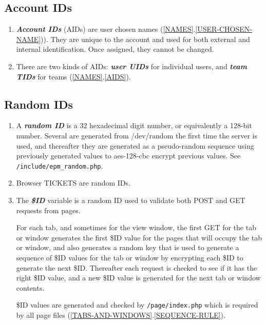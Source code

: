 \documentclass[12pt]{article}
\newcommand{\key}[1]{{\bf \em #1}}
\newcommand{\sref}[2]{(\ref{#1}.\ref{#2})}
\begin{document}
\subsection{Account IDs}

\begin{enumerate}
\item \key{Account IDs}
      (AIDs) are user chosen names \sref{NAMES}{USER-CHOSEN-NAME}).
      They are unique to the
      account and used for both external and internal identification.
      Once assigned, they cannot be changed.
\item There are two kinds of AIDs: \key{user UIDs} for individual users,
      and \key{team TIDs} for teams \sref{NAMES}{AIDS}.
\end{enumerate}

\subsection{Random IDs}

\begin{enumerate}
\item A \key{random ID} is a 32 hexadecimal digit number, or equivalently
      a 128-bit number.  Several are generated from /dev/random
      the first time the server is used, and thereafter they
      are generated as a pseudo-random sequence using previously
      generated values to aes-128-cbc encrypt previous values.
      See {\tt /include/epm\_random.php}.
\item Browser TICKETS are random IDs.
\item The \key{\$ID} variable is a random ID used to validate
      both POST and GET requests from pages.
      
      For each tab, and
      sometimes for the view window, the first GET for the tab
      or window generates the first \$ID value for the pages
      that will occupy the tab or window, and also generates
      a random key that is used to generate a sequence
      of \$ID values for the tab or window by encrypting
      each \$ID to generate the next \$ID.  Thereafter each
      request is checked to see if it has the right \$ID value,
      and a new \$ID value is generated for the next tab or
      window contents.

      \$ID values are generated and checked by {\tt /page/index.php}
      which is required by all page files
      \sref{TABS-AND-WINDOWS}{SEQUENCE-RULE}.
\end{enumerate}
\end{document}
